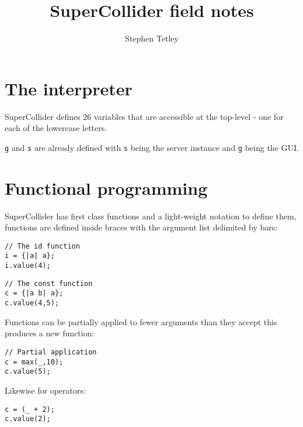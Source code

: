 \documentclass{article}
\begin{document}
\author{Stephen Tetley}
\title{SuperCollider field notes}
\maketitle




\section{The interpreter}


SuperCollider defines 26 variables that are accessible at the 
top-level - one for each of the lowercase letters. 

\texttt{g} and \texttt{s} are already defined with \texttt{s} 
being the server instance and \texttt{g} being the GUI.

\section{Functional programming}

SuperCollider has first class functions and a light-weight 
notation to define them, functions are defined inside braces with
the argument list delimited by bars:

\begin{verbatim}
// The id function
i = {|a| a};
i.value(4);
\end{verbatim}

\begin{verbatim}
// The const function
c = {|a b| a};
c.value(4,5);
\end{verbatim}

Functions can be partially applied to fewer arguments than they 
accept this produces a new function:

\begin{verbatim}
// Partial application
c = max(_,10);
c.value(5);
\end{verbatim}

Likewise for operators:

\begin{verbatim}
c = (_ + 2);
c.value(2);
\end{verbatim}
\end{document}
